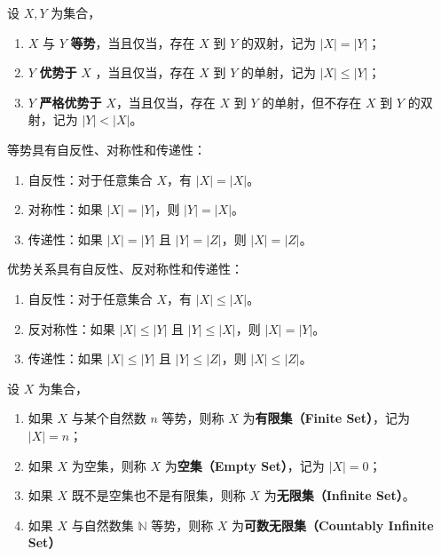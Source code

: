 \begin{definition}
    设 $ X, Y $ 为集合，
    \begin{enumerate}
        \item $ X $ 与 $ Y $ \textbf{等势}，当且仅当，存在 $ X $ 到 $ Y $ 的双射，记为 $ |X| = |Y| $；
        \item $ Y $ \textbf{优势于} $ X $ ，当且仅当，存在 $ X $ 到 $ Y $ 的单射，记为 $ |X| \leq |Y| $；
        \item $ Y $ \textbf{严格优势于} $ X $，当且仅当，存在 $ X $ 到 $ Y $ 的单射，但不存在 $ X $ 到 $ Y $ 的双射，记为 $ |Y| < |X| $。
    \end{enumerate}
\end{definition}
\vspace{0.5em}

\begin{proposition}
    等势具有自反性、对称性和传递性：
    \begin{enumerate}
        \item 自反性：对于任意集合 $ X $，有 $ |X| = |X| $。
        \item 对称性：如果 $ |X| = |Y| $，则 $ |Y| = |X| $。
        \item 传递性：如果 $ |X| = |Y| $ 且 $ |Y| = |Z| $，则 $ |X| = |Z| $。
    \end{enumerate}
\end{proposition}
\vspace{0.5em}

\begin{proposition}
    优势关系具有自反性、反对称性和传递性：
    \begin{enumerate}
        \item 自反性：对于任意集合 $ X $，有 $ |X| \leq |X| $。
        \item 反对称性：如果 $ |X| \leq |Y| $ 且 $ |Y| \leq |X| $，则 $ |X| = |Y| $。
        \item 传递性：如果 $ |X| \leq |Y| $ 且 $ |Y| \leq |Z| $，则 $ |X| \leq |Z| $。
    \end{enumerate}
\end{proposition}
\vspace{0.5em}

\begin{definition}[有限集与无限集]
    设 $ X $ 为集合，
    \begin{enumerate}
        \item 如果 $ X $ 与某个自然数 $ n $ 等势，则称 $ X $ 为\textbf{有限集（Finite Set）}，记为 $ |X| = n $；
        \item 如果 $ X $ 为空集，则称 $ X $ 为\textbf{空集（Empty Set）}，记为 $ |X| = 0 $；
        \item 如果 $ X $ 既不是空集也不是有限集，则称 $ X $ 为\textbf{无限集（Infinite Set）}。
        \item 如果 $ X $ 与自然数集 $ \mathbb{N} $ 等势，则称 $ X $ 为\textbf{可数无限集（Countably Infinite Set）}
    \end{enumerate}
\end{definition}
\vspace{0.5em}

